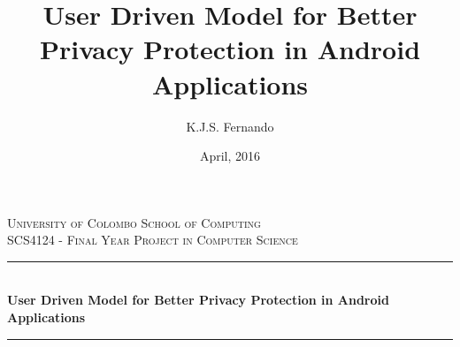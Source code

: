 

\author{K.J.S. Fernando}
\title{User Driven Model for Better Privacy Protection in Android Applications}
\date{April, 2016}

\newcommand{\namesigdate}[2][5cm]{%
  \begin{tabular}{@{}p{#1}@{}}
    #2 \\[2\normalbaselineskip] \hrule \\[0pt]
    {\small \textit{Signature}} \\[2\normalbaselineskip] \hrule \\[0pt]
    {\small \textit{Date}}
  \end{tabular}
}

\frontmatter
\begin{titlepage}
\newcommand{\HRule}{\rule{\linewidth}{0.5mm}} %

\center %
 

\textsc{\LARGE University of Colombo School of Computing}\\[1.5cm] %
\textsc{\Large SCS4124 - Final Year Project in Computer Science}\\[0.5cm] %


\HRule \\[0.7cm]
{ \huge \bfseries User Driven Model for Better Privacy Protection in Android Applications}\\[0.7cm] %
\HRule \\[9cm]




\end{titlepage}

